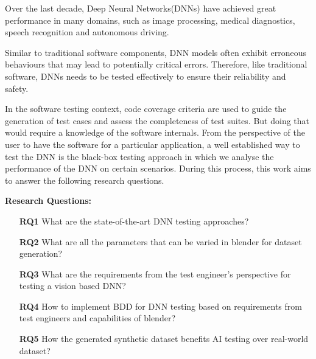 \documentclass[rnd]{mas_proposal}
\begin{document}
Over the last decade, Deep Neural Networks(DNNs) have achieved great performance in many domains, such as image processing, medical diagnostics, speech recognition and autonomous driving. 

Similar to traditional software components, DNN models often exhibit erroneous behaviours that may lead to potentially critical errors. Therefore, like traditional software, DNNs needs to be tested effectively to ensure their reliability and safety.

In the software testing context, code coverage criteria are used to guide the generation of test cases and assess the completeness of test suites. But doing that would require a knowledge of the software internals. From the perspective of the user to have the software for a particular application, a well established way to test the DNN is the black-box testing approach in which we analyse the performance of the DNN on certain scenarios. During this process, this work aims to answer the following research questions.

\textbf{Research Questions:}

\begin{itemize}
    \begin{itemize}
        \item[\textbf{RQ1}] What are the state-of-the-art DNN testing approaches?
        \item[\textbf{RQ2}] What are all the parameters that can be varied in blender for dataset generation?
        \item[\textbf{RQ3}] What are the requirements from the test engineer's perspective for testing a vision based DNN?
        \item[\textbf{RQ4}] How to implement BDD for DNN testing based on requirements from test engineers and capabilities of blender?
        \item[\textbf{RQ5}] How the generated synthetic dataset benefits AI testing over real-world dataset?
    \end{itemize}

\end{itemize}
\end{document}
